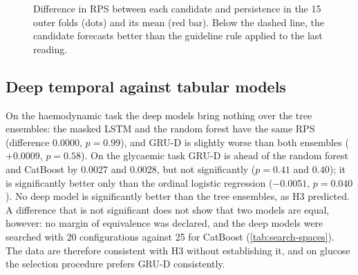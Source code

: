 \documentclass[11pt,a4paper,oneside]{report}
\begin{document}
\begin{figure}[htbp]
\centering
{}
\caption{Difference in RPS between each candidate and persistence in the 15 outer folds (dots) and its mean (red bar). Below the dashed line, the candidate forecasts better than the guideline rule applied to the last reading.}\label{fig:delta-rps}
\end{figure}




\subsection{Deep temporal against tabular models}

On the haemodynamic task the deep models bring nothing over the tree ensembles: the masked LSTM and the random forest have the same RPS (difference $0.0000$, $p = 0.99$), and GRU-D is slightly worse than both ensembles ($+0.0009$, $p = 0.58$). On the glycaemic task GRU-D is ahead of the random forest and CatBoost by 0.0027 and 0.0028, but not significantly ($p = 0.41$ and $0.40$); it is significantly better only than the ordinal logistic regression ($-0.0051$, $p = 0.040$). No deep model is significantly better than the tree ensembles, as H3 predicted. A difference that is not significant does not show that two models are equal, however: no margin of equivalence was declared, and the deep models were searched with 20 configurations against 25 for CatBoost (\cref{tab:search-spaces}). The data are therefore consistent with H3 without establishing it, and on glucose the selection procedure prefers GRU-D consistently.
\end{document}
